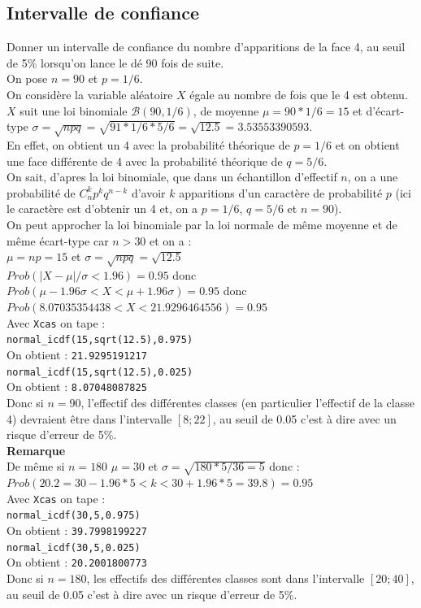 \documentclass[a4paper,11pt]{book}
\begin{document}
\subsection{Intervalle de confiance}
Donner un intervalle de confiance du nombre d'apparitions de la face 4, au 
seuil de 5\% lorsqu'on lance le d\'e 90 fois de suite.\\
On pose $n=90$ et $p=1/6$.\\
On consid\`ere la variable al\'eatoire $X$ \'egale au nombre de 
fois que le 4 est obtenu. $X$ suit une  loi binomiale $\mathcal B(90,1/6)$,
 de moyenne $\mu=90*1/6=15$ et d'\'ecart-type
$\sigma=\sqrt{npq}=\sqrt{91*1/6*5/6}=\sqrt{12.5}=3.53553390593$.\\
En effet, on obtient un 4 avec la probabilit\'e
 th\'eorique de $p=1/6$ et on obtient une face diff\'erente de 4 avec la
 probabilit\'e th\'eorique de $q=5/6$.\\
On sait, d'apres la loi binomiale, que dans un \'echantillon d'effectif $n$, 
on a une  probabilit\'e de $C_n^kp^kq^{n-k}$ d'avoir $k$ apparitions  d'un 
caract\`ere de probabilit\'e $p$ (ici le caract\`ere est d'obtenir un 4 et,
on a  $p=1/6$, $q=5/6$ et $n=90$).\\
  On peut approcher la loi binomiale par la loi normale de m\^eme moyenne et de m\^eme \'ecart-type car $n>30$ et on a :\\
$\mu=np=15$ et $\sigma=\sqrt{npq}=\sqrt{12.5}$\\
$Prob(|X-\mu|/\sigma<1.96)=0.95$ donc\\ 
$Prob(\mu-1.96\sigma<X<\mu+1.96\sigma)=0.95$ donc\\
$Prob(8.07035354438<X<21.9296464556)=0.95$\\
Avec {\tt Xcas} on tape :\\
{\tt normal\_icdf(15,sqrt(12.5),0.975)}\\
On obtient : {\tt 21.9295191217}\\
{\tt normal\_icdf(15,sqrt(12.5),0.025)}\\
On obtient : {\tt 8.07048087825}\\
Donc si $n=90$, l'effectif des diff\'erentes classes (en particulier l'effectif
de la classe 4) devraient \^etre dans l'intervalle $[8;22]$, au seuil de 0.05
 c'est \`a dire avec un risque d'erreur de 5\%.\\
{\bf Remarque}\\
De m\^eme si $n=180$ $\mu=30$ et $\sigma=\sqrt{180*5/36=5}$ donc :\\
$Prob(20.2=30-1.96*5<k<30+1.96*5=39.8)=0.95$\\
Avec {\tt Xcas} on tape :\\
{\tt normal\_icdf(30,5,0.975)}\\
On obtient : {\tt 39.7998199227}\\
{\tt normal\_icdf(30,5,0.025)}\\
On obtient : {\tt 20.2001800773}\\
Donc si $n=180$, les effectifs des diff\'erentes classes sont dans l'intervalle
 $[20;40]$, au seuil de 0.05 c'est \`a dire avec un risque d'erreur de 5\%.
\end{document}
